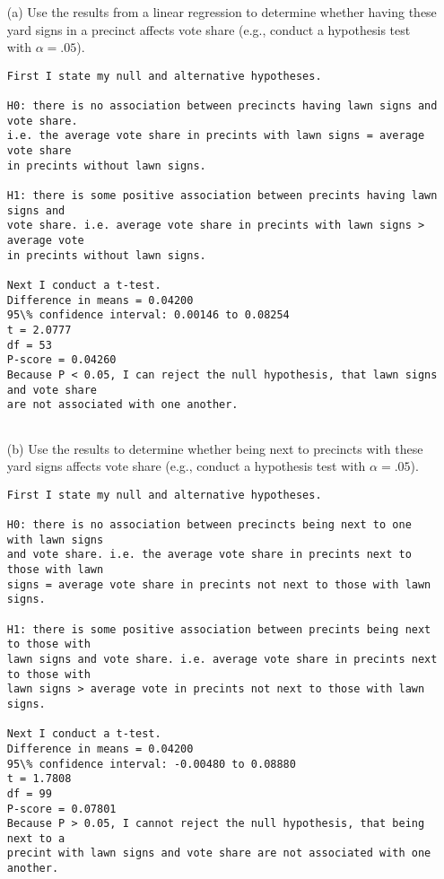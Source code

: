 \documentclass[12pt,letterpaper]{article}
\begin{document}
\vspace{.5cm}
\begin{enumerate}
	\item [(a)] Use the results from a linear regression to determine whether having these yard signs in a precinct affects vote
share (e.g., conduct a hypothesis test with $\alpha = .05$).

\begin{verbatim}
First I state my null and alternative hypotheses.

H0: there is no association between precincts having lawn signs and vote share.
i.e. the average vote share in precints with lawn signs = average vote share
in precints without lawn signs.

H1: there is some positive association between precints having lawn signs and
vote share. i.e. average vote share in precints with lawn signs > average vote
in precints without lawn signs.

Next I conduct a t-test.
Difference in means = 0.04200
95\% confidence interval: 0.00146 to 0.08254
t = 2.0777
df = 53
P-score = 0.04260
Because P < 0.05, I can reject the null hypothesis, that lawn signs and vote share
are not associated with one another.
 
\end{verbatim}

	\newpage		
	\item [(b)]  Use the results to determine whether being
	next to precincts with these yard signs affects vote
	share (e.g., conduct a hypothesis test with $\alpha = .05$).
	
\begin{verbatim}
First I state my null and alternative hypotheses.

H0: there is no association between precincts being next to one with lawn signs
and vote share. i.e. the average vote share in precints next to those with lawn
signs = average vote share in precints not next to those with lawn signs.

H1: there is some positive association between precints being next to those with
lawn signs and vote share. i.e. average vote share in precints next to those with
lawn signs > average vote in precints not next to those with lawn signs.

Next I conduct a t-test.
Difference in means = 0.04200
95\% confidence interval: -0.00480 to 0.08880
t = 1.7808
df = 99
P-score = 0.07801
Because P > 0.05, I cannot reject the null hypothesis, that being next to a
precint with lawn signs and vote share are not associated with one another.
\end{verbatim}


\end{enumerate}
\end{document}

